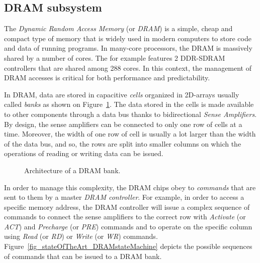 \documentclass[main.tex]{subfiles}
\begin{document}





\subsection{DRAM subsystem}
\label{sssec_stateOfTheArt_basicsDRAM}
The \emph{Dynamic Random Access Memory} (or \emph{DRAM}) is a simple, cheap and compact type of memory that is widely used in modern computers to store code and data of running programs. In many-core processors, the DRAM is massively shared by a number of cores. The \mppalong for example features 2 DDR-SDRAM controllers that are shared among 288 cores. In this context, the management of DRAM accesses is critical for both performance and predictability.

In DRAM, data are stored in capacitive \emph{cells} organized in 2D-arrays usually called \emph{banks} as shown on Figure~\ref{fig_stateOfTheArt_DRAM}. The data stored in the cells is made available to other components through a data bus thanks to bidirectional \emph{Sense Amplifiers}. By design, the sense amplifiers can be connected to only one row of cells at a time. Moreover, the width of one row of cell is usually a lot larger than the width of the data bus, and so, the rows are split into smaller columns on which the operations of reading or writing data can be issued. 

\begin{figure}
    \centering
    \scalebox{0.6}{}
    \caption{Architecture of a DRAM bank.}
    \label{fig_stateOfTheArt_DRAM}
\end{figure}

In order to manage this complexity, the DRAM chips obey to \emph{commands} that are sent to them by a master \emph{DRAM controller}. For example, in order to access a specific memory address, the DRAM controller will issue a complex sequence of commands to connect the sense amplifiers to the correct row with \emph{Activate} (or \emph{ACT}) and \emph{Precharge} (or \emph{PRE}) commands and to operate on the specific column using \emph{Read} (or \emph{RD}) or \emph{Write} (or \emph{WR}) commands. Figure~\ref{fig_stateOfTheArt_DRAMstateMachine} depicts the possible sequences of commands that can be issued to a DRAM bank.
\end{document}
